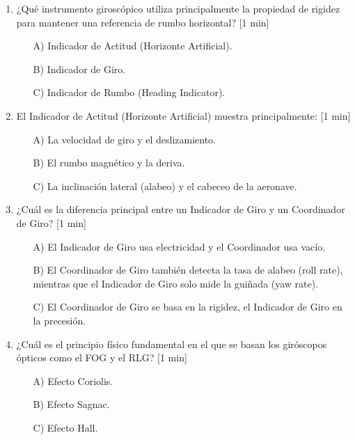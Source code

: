 \begin{enumerate}
\item ¿Qué instrumento giroscópico utiliza principalmente la propiedad de rigidez para mantener una referencia de rumbo horizontal? [1 min]

	\begin{itemize}
		\item[A)] Indicador de Actitud (Horizonte Artificial).
		\item[B)] Indicador de Giro.
		\item[C)] Indicador de Rumbo (Heading Indicator).\\
	\end{itemize}

\item El Indicador de Actitud (Horizonte Artificial) muestra principalmente: [1 min]

	\begin{itemize}
		\item[A)] La velocidad de giro y el deslizamiento.
		\item[B)] El rumbo magnético y la deriva.
		\item[C)] La inclinación lateral (alabeo) y el cabeceo de la aeronave.\\
	\end{itemize}

\item ¿Cuál es la diferencia principal entre un Indicador de Giro y un Coordinador de Giro? [1 min]

	\begin{itemize}
		\item[A)] El Indicador de Giro usa electricidad y el Coordinador usa vacío.
		\item[B)] El Coordinador de Giro también detecta la tasa de alabeo (roll rate), mientras que el Indicador de Giro solo mide la guiñada (yaw rate).
		\item[C)] El Coordinador de Giro se basa en la rigidez, el Indicador de Giro en la precesión.\\
	\end{itemize}

\item ¿Cuál es el principio físico fundamental en el que se basan los giróscopos ópticos como el FOG y el RLG? [1 min]

	\begin{itemize}
		\item[A)] Efecto Coriolis.
		\item[B)] Efecto Sagnac.
		\item[C)] Efecto Hall.\\
	\end{itemize}


\end{enumerate}
